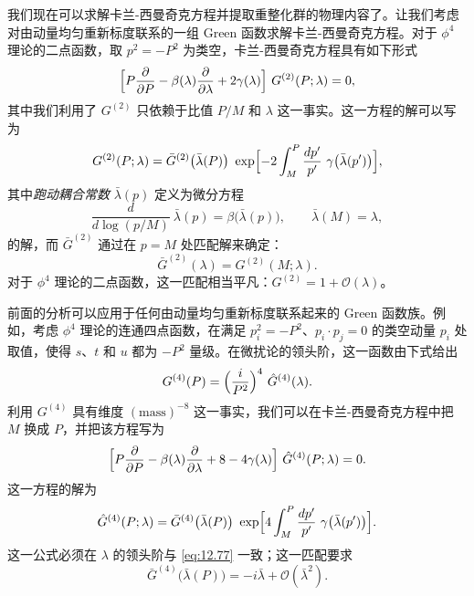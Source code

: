 我们现在可以求解卡兰-西曼奇克方程并提取重整化群的物理内容了。让我们考虑对由动量均匀重新标度联系的一组 Green 函数求解卡兰-西曼奇克方程。对于 $\phi^4$ 理论的二点函数，取 $p^2 = -P^2$ 为类空，卡兰-西曼奇克方程具有如下形式
\begin{equation}
  \Bigl[ P\frac{\partial}{\partial P} - \beta(\lambda)\frac{\partial}
    {\partial\lambda} + 2\gamma(\lambda) \Bigr]\ G^{(2)}(P; \lambda) = 0 ,
  \label{eq:12.70}
\end{equation}
其中我们利用了 $G^{(2)}$ 只依赖于比值 $P/M$ 和 $\lambda$ 这一事实。这一方程的解可以写为
\begin{equation}
  G^{(2)}(P; \lambda) = \bar{G}^{(2)}\bigl( \bar{\lambda}(P) \bigr)\
    \exp\Bigl[ -2\int_{M}^{P} \frac{dp'}{p'}\ \gamma\bigl(
      \bar{\lambda}(p') \bigr) \Bigr] ,
  \label{eq:12.76}
\end{equation}
其中\emph{跑动耦合常数} $\bar{\lambda}(p)$ 定义为微分方程
\begin{equation}
  \frac{d}{d\log(p/M)}\ \bar{\lambda}(p) = \beta\bigl( \bar{\lambda}(p)
    \bigr),\qquad \bar{\lambda}(M) = \lambda ,
  \label{eq:12.73}
\end{equation}
的解，而 $\bar{G}^{(2)}$ 通过在 $p = M$ 处匹配解来确定：
\begin{equation}
  \bar{G}^{(2)}(\lambda) = G^{(2)}(M; \lambda) .
\end{equation}
对于 $\phi^4$ 理论的二点函数，这一匹配相当平凡：$G^{(2)} = 1 + \mathcal{O}(\lambda)$。

前面的分析可以应用于任何由动量均匀重新标度联系起来的 Green 函数族。例如，考虑 $\phi^4$ 理论的连通四点函数，在满足 $p_i^2 = -P^2$、$p_i\cdot p_j = 0$ 的类空动量 $p_i$ 处取值，使得 $s$、$t$ 和 $u$ 都为 $-P^2$ 量级。在微扰论的领头阶，这一函数由下式给出
\begin{equation}
  G^{(4)}(P) = \Bigl( \frac{i}{P^2} \Bigr)^4\ \hat{G}^{(4)}(\lambda) .
  \label{eq:12.77}
\end{equation}
利用 $G^{(4)}$ 具有维度 $(\mathrm{mass})^{-8}$ 这一事实，我们可以在卡兰-西曼奇克方程中把 $M$ 换成 $P$，并把该方程写为
\begin{equation}
  \Bigl[ P\frac{\partial}{\partial P} - \beta(\lambda)\frac{\partial}
    {\partial\lambda} + 8 - 4\gamma(\lambda) \Bigr]\ \hat{G}^{(4)}(P; \lambda)
  = 0 .
  \label{eq:12.78}
\end{equation}
这一方程的解为
\begin{equation}
  \hat{G}^{(4)}(P; \lambda) = \bar{G}^{(4)}\bigl( \bar{\lambda}(P) \bigr)\
    \exp\Bigl[ 4\int_{M}^{P} \frac{dp'}{p'}\ \gamma\bigl(
      \bar{\lambda}(p') \bigr) \Bigr] .
  \label{eq:12.79}
\end{equation}
这一公式必须在 $\lambda$ 的领头阶与 \eqref{eq:12.77} 一致；这一匹配要求
\begin{equation}
  \bar{G}^{(4)}\bigl( \bar{\lambda}(P) \bigr) = -i\bar{\lambda}
    + \mathcal{O}(\bar{\lambda}^2) .
  \label{eq:12.80}
\end{equation}


